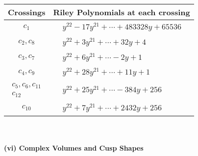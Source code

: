 \documentclass[1p]{elsarticle_modified}
\theoremstyle{definition}
\begin{document}
\begin{tabular}{m{50pt}|m{274pt}}
Crossings & \hspace{64pt}Riley Polynomials at each crossing \\
\hline $$\begin{aligned}c_{1}\end{aligned}$$&$\begin{aligned}
&y^{22}-17 y^{21}+\cdots+483328 y+65536
\end{aligned}$\\
\hline $$\begin{aligned}c_{2},c_{8}\end{aligned}$$&$\begin{aligned}
&y^{22}+3 y^{21}+\cdots+32 y+4
\end{aligned}$\\
\hline $$\begin{aligned}c_{3},c_{7}\end{aligned}$$&$\begin{aligned}
&y^{22}+6 y^{21}+\cdots-2 y+1
\end{aligned}$\\
\hline $$\begin{aligned}c_{4},c_{9}\end{aligned}$$&$\begin{aligned}
&y^{22}+28 y^{21}+\cdots+11 y+1
\end{aligned}$\\
\hline $$\begin{aligned}c_{5},c_{6},c_{11}\\c_{12}\end{aligned}$$&$\begin{aligned}
&y^{22}+25 y^{21}+\cdots-384 y+256
\end{aligned}$\\
\hline $$\begin{aligned}c_{10}\end{aligned}$$&$\begin{aligned}
&y^{22}+7 y^{21}+\cdots+2432 y+256
\end{aligned}$\\
\hline
\end{tabular}\\~\\
\newpage\flushleft \textbf{(vi) Complex Volumes and Cusp Shapes}
\end{document}
